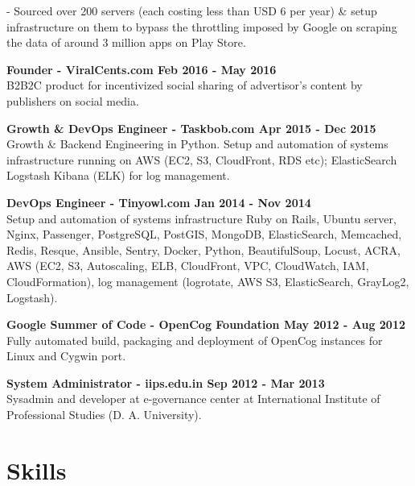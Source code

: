\documentclass[overlapped,centered]{resume}
\begin{document}
\begin{resume}
\begin{list2}
		- Sourced over 200 servers (each costing less than USD 6 per year) \& setup infrastructure on them to bypass the throttling imposed by Google on scraping the data of around 3 million apps on Play Store.

	\setlength{\leftskip}{0pt}

    \item \textbf{Founder - ViralCents.com \hspace{75mm} Feb 2016 - May 2016} \\ B2B2C product for incentivized social sharing of advertisor's content by publishers on social media.
    
    \item \textbf{Growth \& DevOps Engineer - Taskbob.com \hspace{45mm} Apr 2015 - Dec 2015} \\ Growth \& Backend Engineering in Python. Setup and automation of systems infrastructure running on AWS (EC2, S3, CloudFront, RDS etc); ElasticSearch Logstash Kibana (ELK) for log management.
    
    \item \textbf{DevOps Engineer - Tinyowl.com \hspace{65mm} Jan 2014 - Nov 2014} \\ Setup and automation of systems infrastructure Ruby on Rails, Ubuntu server, Nginx, Passenger, PostgreSQL, PostGIS, MongoDB, ElasticSearch, Memcached, Redis, Resque, Ansible, Sentry, Docker, Python, BeautifulSoup, Locust, ACRA, AWS (EC2, S3, Autoscaling, ELB, CloudFront, VPC, CloudWatch, IAM, CloudFormation), log management (logrotate, AWS S3, ElasticSearch, GrayLog2, Logstash).
    
	\item \textbf{Google Summer of Code - OpenCog Foundation \hspace{35mm} May 2012 - Aug 2012} \\ Fully automated build, packaging and deployment of OpenCog instances for Linux and Cygwin port.

	\item \textbf{System Administrator - iips.edu.in \hspace{60mm} Sep 2012 - Mar 2013} \\ Sysadmin and developer at e-governance center at International Institute of Professional Studies (D. A. University).

	\end{list2}

    \section{\mysidestyle Skills} 


\end{resume}
\end{document}
